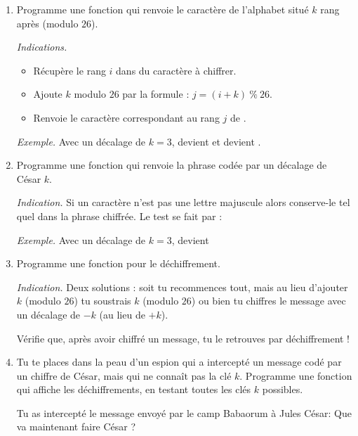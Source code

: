 \documentclass[11pt,class=report,crop=false]{standalone}
\begin{document}

\begin{activite}



\begin{enumerate}
  \item Programme une fonction 
  qui renvoie le caractère de l'alphabet situé $k$ rang après (modulo $26$).
  
  \emph{Indications.}
  \begin{itemize}
    \item Récupère le rang $i$ dans  du caractère à chiffrer.
    \item Ajoute $k$ modulo $26$ par la formule : $j = (i + k) \ \% \ 26$.
    \item Renvoie le caractère correspondant au rang $j$ de .
  \end{itemize}
  
  \emph{Exemple.}
  Avec un décalage de $k=3$,  devient  et  devient .
  
  \item Programme une fonction  qui renvoie la phrase codée par un décalage de César $k$. 
  
  \emph{Indication.} Si un caractère n'est pas une lettre majuscule alors conserve-le tel quel dans la phrase chiffrée. Le test se fait par :
  
   \emph{Exemple.}
  Avec un décalage de $k=3$,  devient 
   
  \item Programme une fonction  pour le déchiffrement.
  
  \emph{Indication.} Deux solutions : soit tu recommences tout, mais au lieu d'ajouter $k$ (modulo $26$) tu soustrais $k$ (modulo $26$) ou bien tu chiffres le message avec un décalage de $-k$ (au lieu de $+k$).  
  
  Vérifie que, après avoir chiffré un message, tu le retrouves par déchiffrement !
  
  \item Tu te places dans la peau d'un espion qui a intercepté un message codé par un chiffre de César, mais qui ne connaît pas la clé $k$. Programme une fonction  qui affiche les déchiffrements, en testant toutes les clés $k$ possibles.

Tu as intercepté le message envoyé par le camp Babaorum à Jules César:
Que va maintenant faire César ?  
    
\end{enumerate}  
 
\end{activite}
\end{document}

